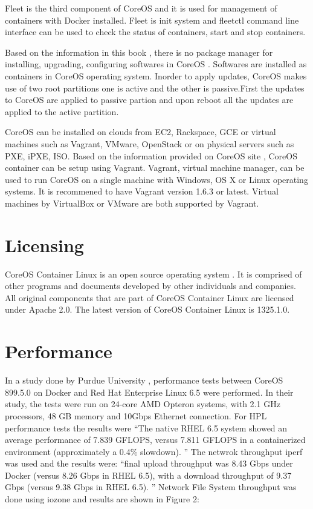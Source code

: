 \documentclass[9pt,twocolumn,twoside]{../../styles/osajnl}
\begin{document}
Fleet is the third component of CoreOS and it is used for management
of containers with Docker installed. Fleet is init system and fleetctl
command line interface can be used to check the status of containers,
start and stop containers.\cite{www-coreOSquickstart}

Based on the information in this book \cite{coreOSBook}, there is no package
manager for installing, upgrading, configuring softwares in CoreOS
. Softwares are installed as containers in CoreOS operating
system. Inorder to apply updates, CoreOS makes use of two root
partitions one is active and the other is passive.First the updates to
CoreOS are applied to passive partion and upon reboot all the updates
are applied to the active partition.

CoreOS can be installed on clouds from EC2, Rackspace, GCE or virtual
machines such as Vagrant, VMware, OpenStack or on physical servers
such as PXE, iPXE, ISO. \cite{www-coreOSquickstart}Based on the
information provided on CoreOS site \cite{www-coreOSvagrant}, CoreOS
container can be setup using Vagrant. Vagrant, virtual machine
manager, can be used to run CoreOS on a single machine with Windows,
OS X or Linux operating systems. It is recommened to have Vagrant
version 1.6.3 or latest. Virtual machines by VirtualBox or VMware are
both supported by Vagrant.

\section{Licensing}

CoreOS Container Linux is an open source operating system . It is
comprised of other programs and documents developed by other
individuals and companies. All original components that are part of
CoreOS Container Linux are licensed under Apache 2.0.  The latest
version of CoreOS Container Linux is 1325.1.0. \cite{www-core}


\section{Performance}

In a study done by Purdue University \cite{julian2016containers} ,
performance tests between CoreOS 899.5.0 on Docker and Red Hat
Enterprise Linux 6.5 were performed. In their study, the tests were
run on 24-core AMD Opteron systems, with 2.1 GHz processors, 48 GB
memory and 10Gbps Ethernet connection.  For HPL performance tests the
results were “The native RHEL 6.5 system showed an average performance
of 7.839 GFLOPS, versus 7.811 GFLOPS in a containerized environment
(approximately a 0.4\% slowdown). ” The netwrok throughput iperf was
used and the results were: “final upload throughput was 8.43 Gbps
under Docker (versus 8.26 Gbps in RHEL 6.5), with a download
throughput of 9.37 Gbps (versus 9.38 Gbps in RHEL 6.5). ” Network File
System throughput was done using iozone and results are shown in
Figure 2:
\end{document}
